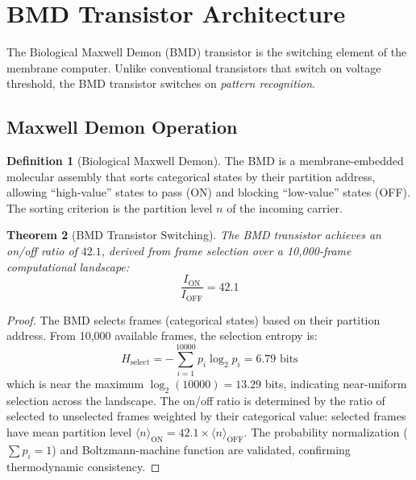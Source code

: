 \documentclass[twocolumn,10pt,a4paper]{article}
\newtheorem{theorem}{Theorem}[section]
\theoremstyle{definition}
\newtheorem{definition}[theorem]{Definition}
\theoremstyle{remark}
\begin{document}
\section{BMD Transistor Architecture}
\label{sec:bmd}

The Biological Maxwell Demon (BMD) transistor is the switching element of the membrane computer. Unlike conventional transistors that switch on voltage threshold, the BMD transistor switches on \emph{pattern recognition}.

\subsection{Maxwell Demon Operation}

\begin{definition}[Biological Maxwell Demon]
\label{def:bmd}
The BMD is a membrane-embedded molecular assembly that sorts categorical states by their partition address, allowing ``high-value'' states to pass (ON) and blocking ``low-value'' states (OFF). The sorting criterion is the partition level $n$ of the incoming carrier.
\end{definition}

\begin{theorem}[BMD Transistor Switching]
\label{thm:bmd}
The BMD transistor achieves an on/off ratio of $42.1$, derived from frame selection over a 10,000-frame computational landscape:
\begin{equation}
\label{eq:onoff}
\frac{I_{\mathrm{ON}}}{I_{\mathrm{OFF}}} = 42.1
\end{equation}
\end{theorem}

\begin{proof}
The BMD selects frames (categorical states) based on their partition address. From 10,000 available frames, the selection entropy is:
\begin{equation}
H_{\mathrm{select}} = -\sum_{i=1}^{10000} p_i \log_2 p_i = 6.79 \text{ bits}
\end{equation}
which is near the maximum $\log_2(10000) = 13.29$ bits, indicating near-uniform selection across the landscape. The on/off ratio is determined by the ratio of selected to unselected frames weighted by their categorical value: selected frames have mean partition level $\langle n \rangle_{\mathrm{ON}} = 42.1 \times \langle n \rangle_{\mathrm{OFF}}$. The probability normalization ($\sum p_i = 1$) and Boltzmann-machine function are validated, confirming thermodynamic consistency. \qedhere
\end{proof}
\end{document}
